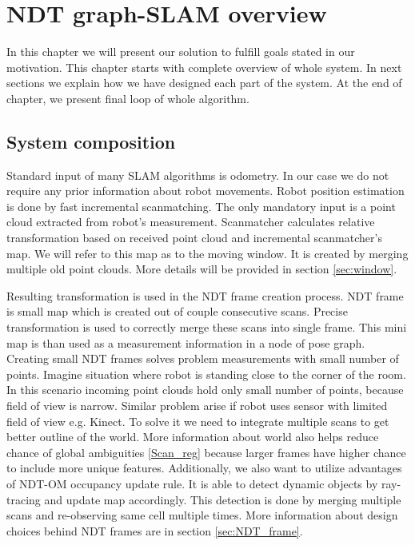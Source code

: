 \chapter{NDT graph-SLAM overview}
In this chapter we will present our solution to fulfill goals stated in our motivation. This chapter starts with complete overview of whole system. In next sections we explain how we have designed each part of the system. At the end of chapter, we present final loop of whole algorithm. 
\section{System composition}
\label{sec:Sys_arch}

Standard input of many \gls{SLAM} algorithms is odometry. In our case we do not require any prior information about robot movements. Robot position estimation is done by fast incremental scanmatching. The only mandatory input is a point cloud extracted from robot's measurement. Scanmatcher calculates relative transformation based on received point cloud and incremental scanmatcher's map. We will refer to this map as to the moving window. It is created by merging multiple old point clouds. More details will be provided in section \ref{sec:window}.

Resulting transformation is used in the \gls{NDT} frame creation process. \gls{NDT} frame is small map which is created out of couple consecutive scans. Precise transformation is used to correctly merge these scans into single frame. This mini map is than used as a measurement information in a node of pose graph. Creating small \gls{NDT} frames solves problem measurements with small number of points. Imagine situation where robot is standing close to the corner of the room. In this scenario incoming point clouds hold only small number of points, because field of view is narrow. Similar problem arise if robot uses sensor with limited field of view e.g. Kinect. To solve it we need to integrate multiple scans to get better outline of the world. More information about world also helps reduce chance of global ambiguities \ref{Scan_reg} because larger frames have higher chance to include more unique features. Additionally, we also want to utilize advantages of \gls{NDT-OM} occupancy update rule. It is able to detect dynamic objects by ray-tracing and update map accordingly. This detection is done by merging multiple scans and re-observing same cell multiple times. More information about design choices behind \gls{NDT} frames are in section \ref{sec:NDT_frame}.

